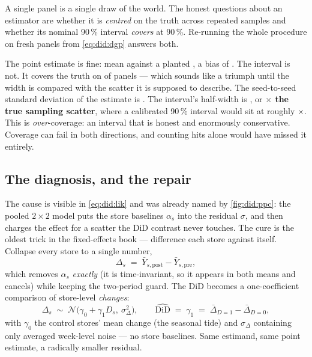 A single panel is a single draw of the world. The honest questions about an estimator are whether it
is \emph{centred} on the truth across repeated samples and whether its nominal 90\,\% interval
\emph{covers} at 90\,\%. Re-running the whole procedure on \nbEightSeedN{} fresh panels from
\cref{eq:did:dgp} answers both.

The point estimate is fine: mean \eur{\nbEightSeedMean} against a planted \eur{\nbEightTrueEffect},
a bias of \eur{\nbEightSeedBiasAbs}. The interval is not. It covers the truth on
\nbEightSeedCov{} of \nbEightSeedN{} panels --- which sounds like a triumph until the width is
compared with the scatter it is supposed to describe. The seed-to-seed standard deviation of the
estimate is \eur{\nbEightSeedSd}. The interval's half-width is \eur{\nbEightBayesHalf}, or
\textbf{\nbEightPooledOverScatter$\times$ the true sampling scatter}, where a calibrated 90\,\%
interval would sit at roughly \nbEightCalibratedRatio$\times$. This is \emph{over}-coverage: an
interval that is honest and enormously conservative. Coverage can fail in both directions, and
counting hits alone would have missed it entirely.

\subsection*{The diagnosis, and the repair}

The cause is visible in \cref{eq:did:lik} and was already named by \cref{fig:did:ppc}: the pooled
$2 \times 2$ model puts the store baselines $\alpha_s$ into the residual $\sigma$, and then charges
the effect for a scatter the DiD contrast never touches. The cure is the oldest trick in the
fixed-effects book --- difference each store against itself. Collapse every store to a single
number,
%
\begin{equation}
  \Delta_s \;=\; \bar Y_{s,\text{post}} - \bar Y_{s,\text{pre}},
  \label{eq:did:delta}
\end{equation}
%
which removes $\alpha_s$ \emph{exactly} (it is time-invariant, so it appears in both means and
cancels) while keeping the two-period \citeauthor{bertrand2004} guard. The DiD becomes a
one-coefficient comparison of store-level \emph{changes}:
%
\begin{equation}
  \Delta_s \;\sim\; \mathcal N\!\big(\gamma_0 + \gamma_1 D_s,\ \sigma_\Delta^{2}\big),
  \qquad
  \widehat{\text{DiD}} \;=\; \gamma_1 \;=\; \bar\Delta_{D=1} - \bar\Delta_{D=0},
  \label{eq:did:deltamodel}
\end{equation}
%
with $\gamma_0$ the control stores' mean change (the seasonal tide) and $\sigma_\Delta$ containing
only averaged week-level noise --- no store baselines. Same estimand, same point estimate, a
radically smaller residual.

